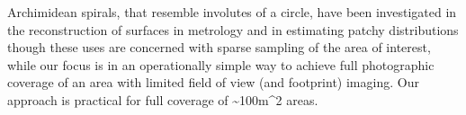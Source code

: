 Archimidean spirals, that resemble involutes of a circle, have been investigated in the reconstruction of surfaces in metrology \cite{Wieczorowski_2001} and in estimating patchy distributions \cite{Kalikhman_2006} though these uses are concerned with sparse sampling of the area of interest, while our focus is in an operationally simple way to achieve full photographic coverage of an area with limited field of view (and footprint) imaging. Our approach is practical for full coverage of \sim{100m^{2}} areas.

  